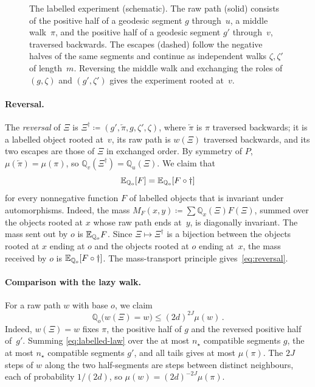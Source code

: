 \begin{figure}[t]
\centering

\caption{The labelled experiment (schematic). The raw path (solid) consists of the positive half of a
geodesic segment $g$ through~$u$, a middle walk~$\pi$, and the positive half of a geodesic segment $g'$
through~$v$, traversed backwards. The escapes (dashed) follow the negative halves of the same segments
and continue as independent walks $\zeta,\zeta'$ of length~$m$. Reversing the middle walk and exchanging
the roles of $(g,\zeta)$ and $(g',\zeta')$ gives the experiment rooted at~$v$.}\label{fig:escapes}
\end{figure}

\paragraph{Reversal.}
The \emph{reversal} of $\Xi$ is $\Xi^\dagger\coloneqq(g',\overleftarrow\pi,g,\zeta',\zeta)$, where
$\overleftarrow\pi$ is $\pi$ traversed backwards; it is a labelled object rooted at~$v$, its raw path is
$w(\Xi)$ traversed backwards, and its two escapes are those of $\Xi$ in exchanged order. By symmetry of
$P$, $\mu(\overleftarrow\pi)=\mu(\pi)$, so $\mathbb Q_v(\Xi^\dagger)=\mathbb Q_u(\Xi)$. We claim that
\begin{equation}\label{eq:reversal}
  \mathbb E_{\mathbb Q_o}[F]=\mathbb E_{\mathbb Q_o}[F\circ\dagger]
\end{equation}
for every nonnegative function $F$ of labelled objects that is invariant under automorphisms. Indeed,
the mass $M_F(x,y)\coloneqq\sum\mathbb Q_x(\Xi)F(\Xi)$, summed over the objects rooted at $x$ whose raw
path ends at~$y$, is diagonally invariant. The mass sent out by $o$ is $\mathbb E_{\mathbb Q_o}F$. Since
$\Xi\mapsto\Xi^\dagger$ is a bijection between the objects rooted at $x$ ending at $o$ and the objects
rooted at $o$ ending at~$x$, the mass received by $o$ is $\mathbb E_{\mathbb Q_o}[F\circ\dagger]$. The
mass-transport principle gives~\eqref{eq:reversal}.

\paragraph{Comparison with the lazy walk.}
For a raw path $w$ with base $o$, we claim
\begin{equation}\label{eq:domination}
  \mathbb Q_o\bigl(w(\Xi)=w\bigr)\le(2d)^{2J}\mu(w)\,.
\end{equation}
Indeed, $w(\Xi)=w$ fixes $\pi$, the positive half of $g$ and the reversed positive half of~$g'$. Summing
\eqref{eq:labelled-law} over the at most $n_\star$ compatible segments $g$, the at most $n_\star$ compatible
segments $g'$, and all tails gives at most $\mu(\pi)$. The $2J$ steps of $w$ along the two
half-segments are steps between distinct neighbours, each of probability $1/(2d)$, so
$\mu(w)=(2d)^{-2J}\mu(\pi)$.

